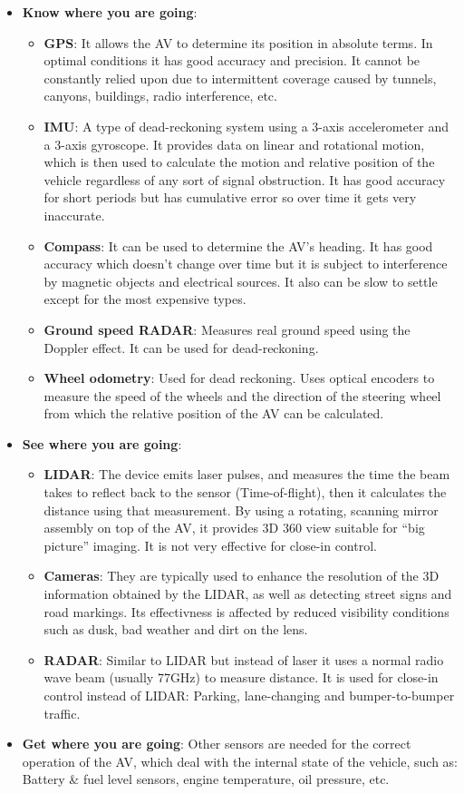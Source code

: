 \documentclass[11pt]{article}
\begin{document}
\begin{itemize}
	\item \textbf{Know where you are going}:
		\begin{itemize}
			\item \textbf{GPS}: It allows the AV to determine its position in absolute terms. In optimal conditions it has good accuracy and precision. It cannot be constantly relied upon due to intermittent coverage caused by tunnels, canyons, buildings, radio interference, etc.
			\item \textbf{IMU}: A type of dead-reckoning system using a 3-axis accelerometer and a 3-axis gyroscope. It provides data on linear and rotational motion, which is then used to calculate the motion and relative position of the vehicle regardless of any sort of signal obstruction. It has good accuracy for short periods but has cumulative error so over time it gets very inaccurate.
			\item \textbf{Compass}: It can be used to determine the AV's heading. It has good accuracy which doesn't change over time but it is subject to interference by magnetic objects and electrical sources. It also can be slow to settle except for the most expensive types.
			\item \textbf{Ground speed RADAR}: Measures real ground speed using the Doppler effect. It can be used for dead-reckoning.
			\item \textbf{Wheel odometry}: Used for dead reckoning. Uses optical encoders to measure the speed of the wheels and the direction of the steering wheel from which the relative position of the AV can be calculated.
		\end{itemize}
	\item \textbf{See where you are going}:
		\begin{itemize}
			\item \textbf{LIDAR}: The device emits laser pulses, and measures the time the beam takes to reflect back to the sensor (Time-of-flight), then it calculates the distance using that measurement. By using a rotating, scanning mirror assembly on top of the AV, it provides 3D 360{\textdegree} view suitable for ``big picture'' imaging. It is not very effective for close-in control.
			\item \textbf{Cameras}: They are typically used to enhance the resolution of the 3D information obtained by the LIDAR, as well as detecting street signs and road markings. Its effectivness is affected by reduced visibility conditions such as dusk, bad weather and dirt on the lens.
			\item \textbf{RADAR}: Similar to LIDAR but instead of laser it uses a normal radio wave beam (usually 77GHz) to measure distance. It is used for close-in control instead of LIDAR: Parking, lane-changing and bumper-to-bumper traffic.
		\end{itemize}
	\item \textbf{Get where you are going}:
		Other sensors are needed for the correct operation of the AV, which deal with the internal state of the vehicle, such as: Battery \& fuel level sensors, engine temperature, oil pressure, etc.
\end{itemize}
\end{document}
